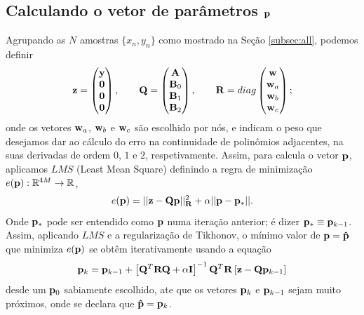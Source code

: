 \subsection{Calculando o vetor de parâmetros $\VECTOR{p}$}
Agrupando as $N$ amostras $\{x_n,y_n\}$ como mostrado na  Seção \ref{subsec:all}, 
podemos definir
\begin{equation}
\VECTOR{z}=
\left(\begin{matrix}
\VECTOR{y} \\
\mathbf{0} \\
\mathbf{0} \\
\mathbf{0} 
\end{matrix}\right),
\qquad 
\MATRIX{Q}=
\left(\begin{matrix}
\mathbf{A} \\
\MATRIX{B}_0 \\
\MATRIX{B}_1 \\
\MATRIX{B}_2 
\end{matrix}\right),
\qquad 
\MATRIX{R}=diag
\left(\begin{matrix}
\VECTOR{w} \\
\VECTOR{w}_a \\
\VECTOR{w}_b \\
\VECTOR{w}_c 
\end{matrix}\right);
\end{equation}
onde os vetores $\VECTOR{w}_a$, $\VECTOR{w}_b$ e $\VECTOR{w}_c$ são escolhido por nós,
e indicam o peso que desejamos dar ao cálculo do erro na continuidade de polinômios adjacentes,
na suas derivadas de ordem $0$, $1$ e $2$, respetivamente. 
Assim, para calcula o vetor $\VECTOR{p}$,  aplicamos $LMS$ (Least Mean Square)
definindo a  regra de minimização $e(\VECTOR{p}):\mathbb{R}^{4M}\rightarrow \mathbb{R}$,
\begin{equation}
 e(\VECTOR{p})=||\VECTOR{z} -\MATRIX{Q}  \VECTOR{p} ||_{\MATRIX{R}}^2+\alpha || \VECTOR{p}-\VECTOR{p}_{*} ||.
\end{equation}
Onde $\VECTOR{p}_{*}$ pode ser entendido como  $\VECTOR{p}$ numa iteração anterior; é dizer $\VECTOR{p}_{*}\equiv \VECTOR{p}_{k-1}$. Assim, aplicando
$LMS$ e a regularização de Tikhonov, o mínimo valor de $\VECTOR{p}=\VECTOR{\hat{p}}$ que minimiza $e(\VECTOR{p})$ 
se obtêm iterativamente usando a equação
\begin{equation}
\VECTOR{p}_{k}= \VECTOR{p}_{k-1}+ \left[ \MATRIX{Q}^T \MATRIX{R}\MATRIX{Q} +\alpha \mathbf{I} \right]^{-1} \MATRIX{Q}^T \MATRIX{R}  \left[ \VECTOR{z}-\MATRIX{Q}  \VECTOR{p}_{k-1} \right]
\end{equation}
desde um $\VECTOR{p}_{0}$ sabiamente escolhido,
ate que os vetores $\VECTOR{p}_{k}$ e $\VECTOR{p}_{k-1}$ sejam muito próximos,
onde se declara que $\VECTOR{\hat{p}}=\VECTOR{p}_{k}$. 



